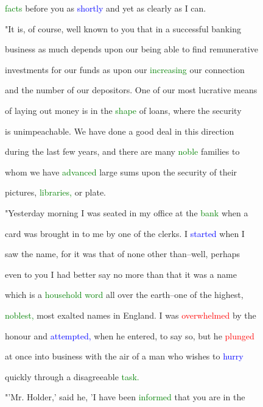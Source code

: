  \textcolor{green}{facts} before you as \textcolor{blue}{shortly} and yet as clearly as I can.



 "It is, of course, well known to you that in a \textcolor{BurntOrange}{successful} banking

 business as much depends upon our being able to find remunerative

 investments for our funds as upon our \textcolor{green}{increasing} our connection

 and the number of our depositors. One of our most lucrative means

 of laying out \textcolor{BurntOrange}{money} is in the \textcolor{green}{shape} of loans, where the security

 is unimpeachable. We have done a \textcolor{BurntOrange}{good} \textcolor{BurntOrange}{deal} in this direction

 during the last few years, and there are many \textcolor{green}{noble} families to

 whom we have \textcolor{green}{advanced} large sums upon the security of their

 pictures, \textcolor{green}{libraries,} or plate.



 "Yesterday morning I was seated in my office at the \textcolor{green}{bank} when a

 card was brought in to me by one of the clerks. I \textcolor{blue}{started} when I

 saw the name, for it was that of none other than--well, perhaps

 even to you I had better say no more than that it was a name

 which is a \textcolor{green}{household} \textcolor{green}{word} all over the earth--one of the highest,

 \textcolor{green}{noblest,} most \textcolor{BurntOrange}{exalted} names in England. I was \textcolor{red}{overwhelmed} by the

 honour and \textcolor{blue}{attempted,} when he entered, to say so, but he \textcolor{red}{plunged}

 at once into business with the air of a man who wishes to \textcolor{blue}{hurry}

 quickly through a disagreeable \textcolor{green}{task.}



 "'Mr. Holder,' said he, 'I have been \textcolor{green}{informed} that you are in the

